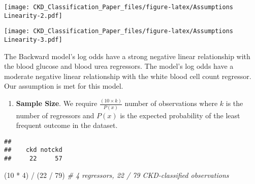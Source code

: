\documentclass[
]{article}
\newenvironment{Shaded}{\begin{snugshade}}{\end{snugshade}}
\newcommand{\AttributeTok}[1]{\textcolor[rgb]{0.77,0.63,0.00}{#1}}
\newcommand{\CommentTok}[1]{\textcolor[rgb]{0.56,0.35,0.01}{\textit{#1}}}
\newcommand{\DecValTok}[1]{\textcolor[rgb]{0.00,0.00,0.81}{#1}}
\newcommand{\FunctionTok}[1]{\textcolor[rgb]{0.00,0.00,0.00}{#1}}
\newcommand{\NormalTok}[1]{#1}
\newcommand{\SpecialCharTok}[1]{\textcolor[rgb]{0.00,0.00,0.00}{#1}}
\newcommand{\StringTok}[1]{\textcolor[rgb]{0.31,0.60,0.02}{#1}}
\providecommand{\tightlist}{%
  \setlength{\itemsep}{0pt}\setlength{\parskip}{0pt}}
\begin{document}
\texttt{[image: CKD\_Classification\_Paper\_files/figure-latex/Assumptions Linearity-2.pdf]}

\begin{Shaded}
\end{Shaded}

\texttt{[image: CKD\_Classification\_Paper\_files/figure-latex/Assumptions Linearity-3.pdf]}

The Backward model's log odds have a strong negative linear relationship
with the blood glucose and blood urea regressors. The model's log odds
have a moderate negative linear relationship with the white blood cell
count regressor. Our assumption is met for this model.

\begin{enumerate}
\def\labelenumi{\arabic{enumi}.}
\setcounter{enumi}{5}
\tightlist
\item
  \textbf{Sample Size}. We require \(\frac{(10 \times k)}{P(x)}\) number
  of observations where \(k\) is the number of regressors and \(P(x)\)
  is the expected probability of the least frequent outcome in the
  dataset.
\end{enumerate}

\begin{Shaded}
\end{Shaded}

\begin{verbatim}
## 
##    ckd notckd 
##     22     57
\end{verbatim}

\begin{Shaded}
\begin{Highlighting}[]
\NormalTok{(}\DecValTok{10} \SpecialCharTok{*} \DecValTok{4}\NormalTok{) }\SpecialCharTok{/}\NormalTok{ (}\DecValTok{22} \SpecialCharTok{/} \DecValTok{79}\NormalTok{) }\CommentTok{\# 4 regressors, 22 / 79 CKD{-}classified observations}
\end{Highlighting}
\end{Shaded}
\end{document}
